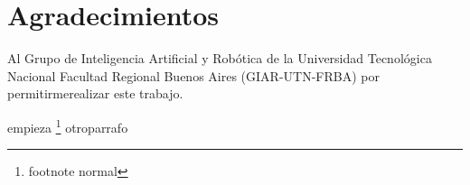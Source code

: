 \chapter*{Agradecimientos}


\noindent Al Grupo de Inteligencia Artificial y Robótica de la Universidad Tecnológica Nacional Facultad Regional Buenos Aires (GIAR-UTN-FRBA) por permitirme\footnotemark realizar este trabajo.


empieza \footnote{footnote normal} otro\footnotemark parrafo

